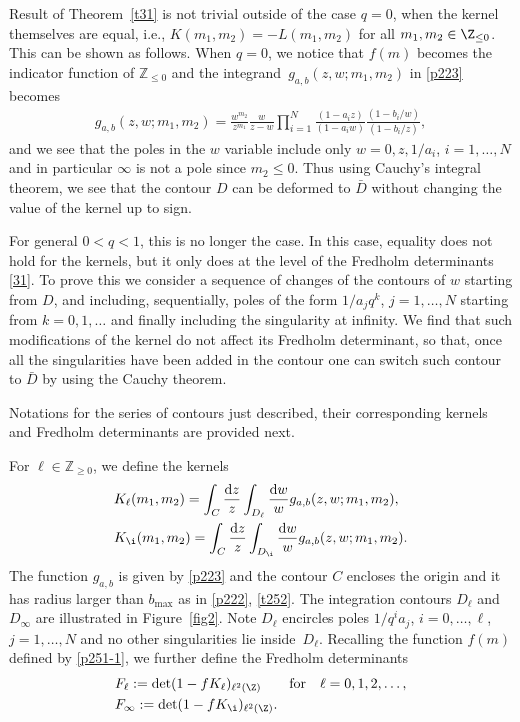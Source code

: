 Result of Theorem~\ref{t31} is not trivial outside of the case $q=0$, when the kernel themselves are equal, i.e., $K(m_1,m_2)=-L(m_1,m_2)$ for all $m_1,m_2\in\Z_{\le 0}$. This can be shown as follows. When $q=0$, we notice that $f(m)$ becomes the indicator function of $\mathbb{Z}_{\le 0}$ and the integrand~${g_{a,b}(z,w;m_1,m_2)}$ in \eqref{p223} becomes
\begin{align*}
 g_{a,b}(z,w;m_1,m_2)
 =\frac{w^{m_2}}{z^{m_1}}
\frac{w}{z-w}
\prod_{i=1}^N
\frac{(1-a_i z)}{(1-a_iw)}
\frac{(1-b_i/w)}{(1-b_i/z)},
\end{align*}
and we see that the poles in the $w$ variable include only $w=0, z, 1/a_i$, $i=1,\dots,N$ and in particular $\infty$ is not a pole since $m_2 \le 0$. Thus using Cauchy's integral theorem, we see that the contour $D$ can be deformed to $\bar{D}$ without changing the value of the kernel up to sign.

For general $0<q<1$, this is no longer the case. In this case, equality does not hold for the kernels, but it only does at the level of the Fredholm determinants \eqref{31}. To prove this we consider a sequence of changes of the contours of $w$ starting from $D$, and including, sequentially, poles of the form $1/a_j q^k$, $j=1,\dots,N$ starting from $k=0,1,\dots$ and finally including the singularity at infinity. We find that such modifications of the kernel do not affect its Fredholm determinant, so that, once all the singularities have been added in the contour one can switch such contour to $\bar{D}$ by using the Cauchy theorem.


Notations for the series of contours just described, their corresponding kernels and Fredholm determinants are provided next.
\begin{Definition}\label{d31}
For $\ell\in\mathbb{Z}_{\ge 0}$, we define the kernels
\begin{align}
\label{d31-3}
&K_\ell (m_1,m_2)=
\int_C\frac{{\rm d}z}{z}\int_{D_\ell}\frac{{\rm d}w}{w} g_{a,b}(z,w;m_1,m_2),
\\
\label{d31-4}
&K_{\i}(m_1,m_2)
=
\int_C\frac{{\rm d}z}{z}\int_{D_{\i}}\frac{{\rm d}w}{w} g_{a,b}(z,w;m_1,m_2).
\end{align}
The function $g_{a,b}$ is given by \eqref{p223} and the contour $C$ encloses the origin and it has radius larger than $b_{\max}$ as in \eqref{p222}, \eqref{t252}. The integration contours $D_\ell$ and $D_{\infty}$ are illustrated in Figure~\ref{fig2}.
Note $D_\ell$ encircles poles $1/q^{i}a_j$, $i=0,\dots,\ell$, $j=1,\dots,N$ and no other singularities lie inside~$D_{\ell}$.
Recalling the function $f(m)$ defined by \eqref{p251-1}, we further define the Fredholm determinants
\begin{align}
\label{d31-1}
&F_\ell:=\det(1-fK_\ell)_{\ell^2(\Z)}\qquad \text{for}\quad \ell=0,1,2,\dots,
\\
\label{d31-2}
&F_{\infty}:=\det(1-f K_{\i})_{\ell^2(\Z)}.
\end{align}
\end{Definition}

